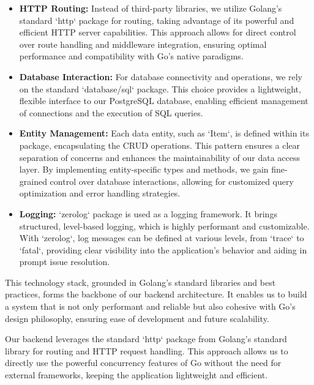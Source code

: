 \begin{itemize}
    \item \textbf{HTTP Routing:} Instead of third-party libraries, we utilize Golang's standard `http` package for routing, taking advantage of its powerful and efficient HTTP server capabilities. This approach allows for direct control over route handling and middleware integration, ensuring optimal performance and compatibility with Go's native paradigms.

    \item \textbf{Database Interaction:} For database connectivity and operations, we rely on the standard `database/sql` package.
    This choice provides a lightweight, flexible interface to our PostgreSQL database, enabling efficient management of connections and the execution of SQL queries.

    \item \textbf{Entity Management:} Each data entity, such as `Item`, is defined within its package, encapsulating the CRUD operations.
    This pattern ensures a clear separation of concerns and enhances the maintainability of our data access layer.
    By implementing entity-specific types and methods, we gain fine-grained control over database interactions, allowing for customized query optimization and error handling strategies.

    \item \textbf{Logging:} `zerolog` package is used as a logging framework.
    It brings structured, level-based logging, which is highly performant and customizable.
    With `zerolog`, log messages can be defined at various levels, from `trace` to `fatal`, providing clear visibility into the application's behavior and aiding in prompt issue resolution.
\end{itemize}

This technology stack, grounded in Golang's standard libraries and best practices, forms the backbone of our backend architecture.
It enables us to build a system that is not only performant and reliable but also cohesive with Go's design philosophy, ensuring ease of development and future scalability.

Our backend leverages the standard `http` package from Golang's standard library for routing and HTTP request handling.
This approach allows us to directly use the powerful concurrency features of Go without the need for external frameworks, keeping the application lightweight and efficient.

